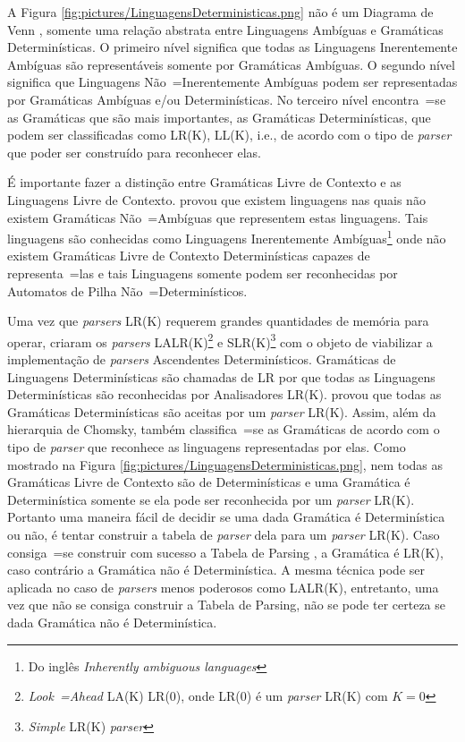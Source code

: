 {    A Figura \ref{fig:pictures/LinguagensDeterministicas.png} não é
    um Diagrama de Venn \cite{generalizedVennDiagrams},
    somente uma relação abstrata entre Linguagens Ambíguas e
    Gramáticas Determinísticas.
    O primeiro nível significa que todas as Linguagens Inerentemente
    Ambíguas são representáveis somente por Gramáticas Ambíguas.
    O segundo nível significa que Linguagens Não~=Inerentemente Ambíguas podem
    ser representadas por Gramáticas Ambíguas e/ou Determinísticas.
    No terceiro nível encontra~=se as Gramáticas que são mais importantes,
    as Gramáticas Determinísticas,
    que podem ser classificadas como LR(K),
    LL(K), i.e.,
    de acordo com o tipo de \textit{parser} que poder ser construído para reconhecer elas.

    É importante fazer a distinção entre Gramáticas Livre de Contexto e
    as Linguagens Livre de Contexto.
     provou que existem linguagens nas quais não
    existem Gramáticas Não~=Ambíguas que representem estas linguagens.
    Tais linguagens são conhecidas como Linguagens Inerentemente Ambíguas\footnote{Do
    inglês \textit{Inherently ambiguous languages}} onde não existem Gramáticas
    Livre de Contexto Determinísticas capazes de representa~=las e
    tais Linguagens somente podem ser reconhecidas por Automatos de Pilha Não~=Determinísticos.

    Uma vez que \textit{parsers} LR(K) requerem grandes quantidades de memória para operar,
     criaram os \textit{parsers}
    LALR(K)\footnote{\textit{Look~=Ahead} LA(K) LR(0),
    onde LR(0) é um \textit{parser} LR(K) com $K=0$
    } e
    SLR(K)\footnote{\textit{Simple} LR(K) \textit{parser}} com o objeto de
    viabilizar a implementação de \textit{parsers} Ascendentes Determinísticos.
    Gramáticas de Linguagens Determinísticas são chamadas de LR por que todas
    as Linguagens Determinísticas são reconhecidas por Analisadores LR(K).
     provou que todas as Gramáticas
    Determinísticas são aceitas por um \textit{parser} LR(K).
    Assim,
    além da hierarquia de Chomsky,
    também classifica~=se as Gramáticas de acordo com o tipo de
    \textit{parser} que reconhece as linguagens representadas por elas.
    Como mostrado na Figura \ref{fig:pictures/LinguagensDeterministicas.png},
    nem todas as Gramáticas Livre de Contexto são de Determinísticas e
    uma Gramática é Determinística somente se ela pode ser reconhecida por um \textit{parser} LR(K).
    Portanto uma maneira fácil de decidir se uma dada Gramática é Determinística ou não,
    é tentar construir a tabela de \textit{parser} dela para um \textit{parser} LR(K).
    Caso consiga~=se construir com sucesso a Tabela de Parsing \cite{ahoCompilerDragonBook},
    a Gramática é LR(K),
    caso contrário a Gramática não é Determinística.
    A mesma técnica pode ser aplicada no caso de \textit{parsers} menos poderosos como LALR(K),
    entretanto,
    uma vez que não se consiga construir a Tabela de Parsing,
    não se pode ter certeza se dada Gramática não é Determinística.

}
